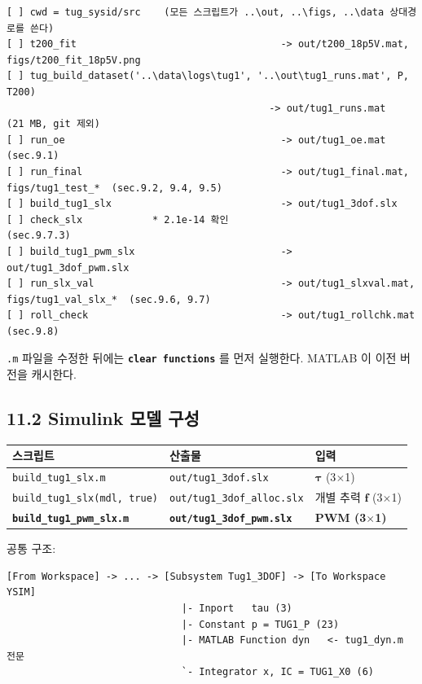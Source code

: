 \documentclass[10pt,a4paper]{article}
\begin{document}
\begin{Verbatim}[fontsize=\scriptsize,frame=single,framesep=2.2mm,rulecolor=\color{black!35}]
[ ] cwd = tug_sysid/src    (모든 스크립트가 ..\out, ..\figs, ..\data 상대경로를 쓴다)
[ ] t200_fit                                   -> out/t200_18p5V.mat, figs/t200_fit_18p5V.png
[ ] tug_build_dataset('..\data\logs\tug1', '..\out\tug1_runs.mat', P, T200)
                                             -> out/tug1_runs.mat   (21 MB, git 제외)
[ ] run_oe                                     -> out/tug1_oe.mat          (sec.9.1)
[ ] run_final                                  -> out/tug1_final.mat, figs/tug1_test_*  (sec.9.2, 9.4, 9.5)
[ ] build_tug1_slx                             -> out/tug1_3dof.slx
[ ] check_slx            * 2.1e-14 확인                                    (sec.9.7.3)
[ ] build_tug1_pwm_slx                         -> out/tug1_3dof_pwm.slx
[ ] run_slx_val                                -> out/tug1_slxval.mat, figs/tug1_val_slx_*  (sec.9.6, 9.7)
[ ] roll_check                                 -> out/tug1_rollchk.mat     (sec.9.8)
\end{Verbatim}

\texttt{.m} 파일을 수정한 뒤에는 \textbf{\texttt{clear functions}} 를 먼저 실행한다. MATLAB 이 이전 버전을 캐시한다.

\subsection*{11.2 Simulink 모델 구성}

\begin{center}\footnotesize\setlength{\tabcolsep}{3pt}
\begin{tabular}{@{}lll@{}}
\toprule
\textbf{스크립트} & \textbf{산출물} & \textbf{입력} \\
\midrule
\texttt{build\_tug1\_slx.m} & \texttt{out/tug1\_3dof.slx} & $\boldsymbol{\tau}$ (3$\times$1) \\
\texttt{build\_tug1\_slx(mdl, true)} & \texttt{out/tug1\_3dof\_alloc.slx} & 개별 추력 $\mathbf{f}$ (3$\times$1) \\
\textbf{\texttt{build\_tug1\_pwm\_slx.m}} & \textbf{\texttt{out/tug1\_3dof\_pwm.slx}} & \textbf{PWM (3$\times$1)} \\
\bottomrule
\end{tabular}
\end{center}

공통 구조:

\begin{Verbatim}[fontsize=\small,frame=single,framesep=2.2mm,rulecolor=\color{black!35}]
[From Workspace] -> ... -> [Subsystem Tug1_3DOF] -> [To Workspace YSIM]
                              |- Inport   tau (3)
                              |- Constant p = TUG1_P (23)
                              |- MATLAB Function dyn   <- tug1_dyn.m 전문
                              `- Integrator x, IC = TUG1_X0 (6)
\end{Verbatim}
\end{document}
